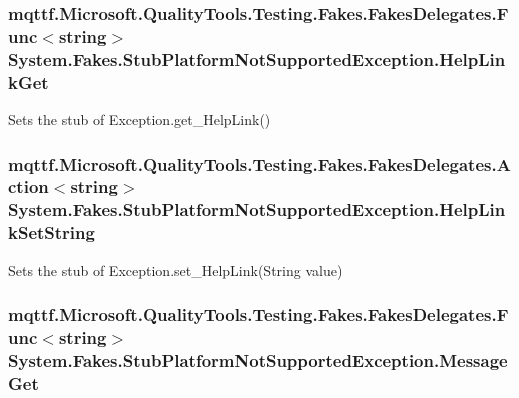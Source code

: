 \hypertarget{class_system_1_1_fakes_1_1_stub_platform_not_supported_exception_af7517714820e60f5e158b074722dd102}{
\subsubsection[{Help\-Link\-Get}]{\setlength{\rightskip}{0pt plus 5cm}mqttf.\-Microsoft.\-Quality\-Tools.\-Testing.\-Fakes.\-Fakes\-Delegates.\-Func$<$string$>$ System.\-Fakes.\-Stub\-Platform\-Not\-Supported\-Exception.\-Help\-Link\-Get}}\label{class_system_1_1_fakes_1_1_stub_platform_not_supported_exception_af7517714820e60f5e158b074722dd102}


Sets the stub of Exception.\-get\-\_\-\-Help\-Link()

\hypertarget{class_system_1_1_fakes_1_1_stub_platform_not_supported_exception_ac8991c41f1ac8d30575c295c9077db9e}{
\subsubsection[{Help\-Link\-Set\-String}]{\setlength{\rightskip}{0pt plus 5cm}mqttf.\-Microsoft.\-Quality\-Tools.\-Testing.\-Fakes.\-Fakes\-Delegates.\-Action$<$string$>$ System.\-Fakes.\-Stub\-Platform\-Not\-Supported\-Exception.\-Help\-Link\-Set\-String}}\label{class_system_1_1_fakes_1_1_stub_platform_not_supported_exception_ac8991c41f1ac8d30575c295c9077db9e}


Sets the stub of Exception.\-set\-\_\-\-Help\-Link(\-String value)

\hypertarget{class_system_1_1_fakes_1_1_stub_platform_not_supported_exception_a4c24a2d71f0e07237227cf624b4056c7}{
\subsubsection[{Message\-Get}]{\setlength{\rightskip}{0pt plus 5cm}mqttf.\-Microsoft.\-Quality\-Tools.\-Testing.\-Fakes.\-Fakes\-Delegates.\-Func$<$string$>$ System.\-Fakes.\-Stub\-Platform\-Not\-Supported\-Exception.\-Message\-Get}}\label{class_system_1_1_fakes_1_1_stub_platform_not_supported_exception_a4c24a2d71f0e07237227cf624b4056c7}


